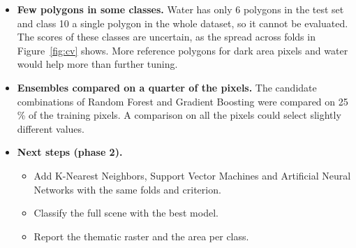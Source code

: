 \documentclass[11pt,a4paper]{article}
\begin{document}
\begin{itemize}
  \item \textbf{Few polygons in some classes.} Water has only 6 polygons in the
  test set and class 10 a single polygon in the whole dataset, so it cannot be
  evaluated. The scores of these classes are uncertain, as the spread across
  folds in Figure~\ref{fig:cv} shows. More reference polygons for dark area
  pixels and water would help more than further tuning.
  \item \textbf{Ensembles compared on a quarter of the pixels.} The candidate
  combinations of Random Forest and Gradient Boosting were compared on 25\,\%
  of the training pixels. A comparison on all the pixels could select slightly
  different values.
  \item \textbf{Next steps (phase 2).}
  \begin{itemize}
    \item Add K-Nearest Neighbors, Support Vector Machines and Artificial
    Neural Networks with the same folds and criterion.
    \item Classify the full scene with the best model.
    \item Report the thematic raster and the area per class.
  \end{itemize}
\end{itemize}
\end{document}
